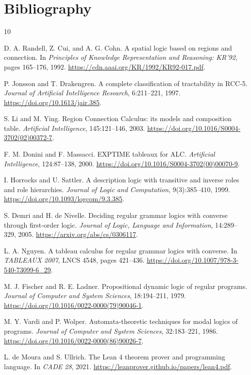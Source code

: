 \documentclass[11pt]{article}
\begin{document}
\section{Bibliography}

\begin{thebibliography}{10}

D. A. Randell, Z. Cui, and A. G. Cohn.
\newblock A spatial logic based on regions and connection.
\newblock In \emph{Principles of Knowledge Representation and Reasoning: KR'92},
pages 165--176, 1992.
\newblock \url{https://cdn.aaai.org/KR/1992/KR92-017.pdf}.

P. Jonsson and T. Drakengren.
\newblock A complete classification of tractability in RCC-5.
\newblock \emph{Journal of Artificial Intelligence Research}, 6:211--221, 1997.
\newblock \url{https://doi.org/10.1613/jair.385}.

S. Li and M. Ying.
\newblock Region Connection Calculus: its models and composition table.
\newblock \emph{Artificial Intelligence}, 145:121--146, 2003.
\newblock \url{https://doi.org/10.1016/S0004-3702(02)00372-7}.

F. M. Donini and F. Massacci.
\newblock EXPTIME tableaux for ALC.
\newblock \emph{Artificial Intelligence}, 124:87--138, 2000.
\newblock \url{https://doi.org/10.1016/S0004-3702(00)00070-9}.

I. Horrocks and U. Sattler.
\newblock A description logic with transitive and inverse roles and role hierarchies.
\newblock \emph{Journal of Logic and Computation}, 9(3):385--410, 1999.
\newblock \url{https://doi.org/10.1093/logcom/9.3.385}.

S. Demri and H. de Nivelle.
\newblock Deciding regular grammar logics with converse through first-order logic.
\newblock \emph{Journal of Logic, Language and Information}, 14:289--329, 2005.
\newblock \url{https://arxiv.org/abs/cs/0306117}.

L. A. Nguyen.
\newblock A tableau calculus for regular grammar logics with converse.
\newblock In \emph{TABLEAUX 2007}, LNCS 4548, pages 421--436.
\newblock \url{https://doi.org/10.1007/978-3-540-73099-6_29}.

M. J. Fischer and R. E. Ladner.
\newblock Propositional dynamic logic of regular programs.
\newblock \emph{Journal of Computer and System Sciences}, 18:194--211, 1979.
\newblock \url{https://doi.org/10.1016/0022-0000(79)90046-1}.

M. Y. Vardi and P. Wolper.
\newblock Automata-theoretic techniques for modal logics of programs.
\newblock \emph{Journal of Computer and System Sciences}, 32:183--221, 1986.
\newblock \url{https://doi.org/10.1016/0022-0000(86)90026-7}.

L. de Moura and S. Ullrich.
\newblock The Lean 4 theorem prover and programming language.
\newblock In \emph{CADE 28}, 2021.
\newblock \url{https://leanprover.github.io/papers/lean4.pdf}.

\end{thebibliography}
\end{document}
